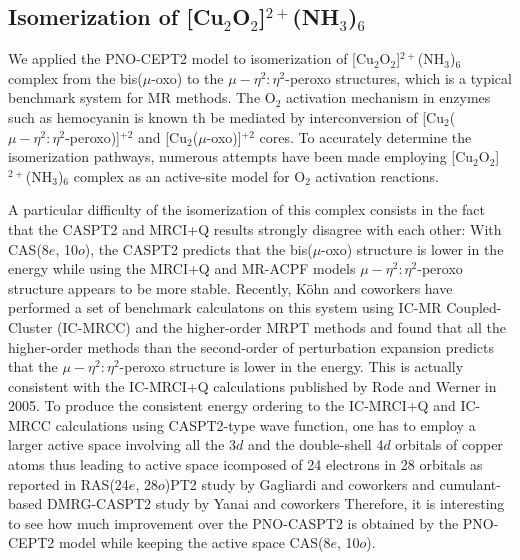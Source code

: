 \documentclass[aip,jcp,amsmath]{revtex4-1}
\begin{document}
\subsection{Isomerization of [Cu${}_2$O${}_2$]${}^{2+}$(NH${}_3$)${}_{6}$}

%
We applied the PNO-CEPT2 model to isomerization of [Cu${}_2$O${}_2$]${}^{2+}$(NH${}_3$)${}_{6}$ complex from the bis($\mu$-oxo) to the $\mu-\eta^2:\eta^2$-peroxo structures, which is a typical benchmark system for MR methods.\cite{Rode2005,AK74,doi:10.1063/1.4900878}
%
The O${}_2$ activation mechanism in enzymes such as hemocyanin is known th be mediated by interconversion of [Cu${}_2$($\mu-\eta^2:\eta^2$-peroxo)]${}^{+2}$ and [Cu${}_2$($\mu$-oxo)]${}^{+2}$ cores.
%
To accurately determine the isomerization pathways, numerous attempts have been made employing [Cu${}_2$O${}_2$]${}^{2+}$(NH${}_3$)${}_{6}$ complex as an active-site model for O${}_2$ activation reactions.

%
A particular difficulty of the isomerization of this complex consists in the fact that the CASPT2 and MRCI+Q results strongly disagree with each other: With CAS(8$e$, 10$o$), the CASPT2 predicts that the bis($\mu$-oxo) structure is lower in the energy while using the MRCI+Q and MR-ACPF models $\mu-\eta^2:\eta^2$-peroxo structure appears to be more stable.
%
Recently, K\"ohn and coworkers\cite{AK74} have performed a set of benchmark calculatons on this system using IC-MR Coupled-Cluster (IC-MRCC)\cite{MHandKoehn2011,hanauercommunication:2012} and the higher-order MRPT methods and found that all the higher-order methods than the second-order of perturbation expansion predicts that the $\mu-\eta^2:\eta^2$-peroxo structure is lower in the energy.
%
This is actually consistent with the IC-MRCI+Q calculations published by Rode and Werner in 2005.\cite{Rode2005}
%
To produce the consistent energy ordering to the IC-MRCI+Q and IC-MRCC calculations using CASPT2-type wave function, one has to employ a larger active space involving all the 3$d$ and the double-shell 4$d$ orbitals of copper atoms thus leading to active space icomposed of 24 electrons in 28 orbitals as reported in RAS(24$e$, 28$o$)PT2 study by Gagliardi and coworkers\cite{doi:10.1021/jp056791e} and cumulant-based DMRG-CASPT2 study by Yanai and coworkers\cite{doi:10.1063/1.4900878}
%
Therefore, it is interesting to see how much improvement over the PNO-CASPT2 is obtained by the PNO-CEPT2 model while keeping the active space CAS(8$e$, 10$o$).
\end{document}
